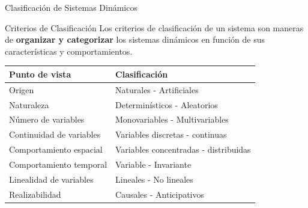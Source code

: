 \documentclass[
    10pt,
    aspectratio=169,
    xcolor={dvipsnames},
    spanish,
    ]{beamer}
\begin{document}
\begin{frame}{Clasificación de Sistemas Dinámicos}
\begin{block}{Criterios de Clasificación}
  Los criterios de clasificación de un sistema son maneras de \textbf{organizar y categorizar} los sistemas dinámicos en función de sus características y comportamientos.
  \begin{table}[h]
    \centering
    \begin{tabular}{|l|l|}
    \hline
    \textbf{Punto de vista} & \textbf{Clasificación} \\
    \hline
    Origen & Naturales - Artificiales \\
    \hline
    Naturaleza & Determinísticos - Aleatorios \\
    \hline
    Número de variables & Monovariables - Multivariables \\
    \hline
    Continuidad de variables & Variables discretas - continuas \\
    \hline
    Comportamiento espacial & Variables concentradas - distribuidas \\
    \hline
    Comportamiento temporal & Variable - Invariante \\
    \hline
    Linealidad de variables & Lineales - No lineales \\
    \hline
    Realizabilidad & Causales - Anticipativos \\
    \hline
    \end{tabular}
  \end{table}
\end{block}
\end{frame}
\end{document}
